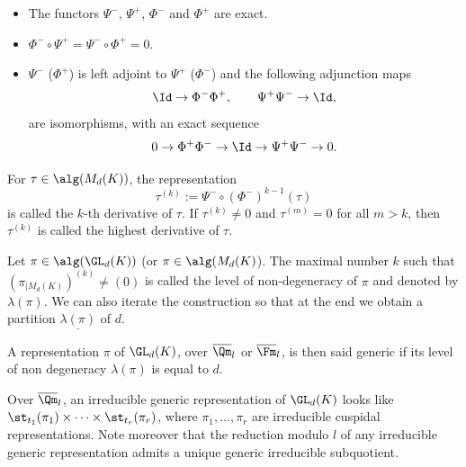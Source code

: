 \skpt
\begin{prop}
\begin{itemize}
\item The functors $\Psi^-$, $\Psi^+$, $\Phi^-$ and $\Phi^+$ are exact.

\item $\Phi^- \circ \Psi^+=\Psi^- \circ \Phi^+=0$.

\item $\Psi^-$ (\resp $\Phi^+$) is left adjoint to $\Psi^+$ (\resp $\Phi^-$) and the
following adjunction maps
\[
\Id \to \Phi^- \Phi^+, \qquad \Psi^+ \Psi^- \to \Id,
\]
are isomorphisms, with an exact sequence
\[
0 \to \Phi^+ \Phi^- \to \Id \to \Psi^+ \Psi^-
\to 0.
\]
\end{itemize}
\end{prop}

\begin{defin}
For $\tau \in \alg(M_d(K))$, the representation
\[
\tau^{(k)}:=\Psi^- \circ (\Phi^-)^{k-1}(\tau)
\]
is called the $k$-th derivative of $\tau$. If $\tau^{(k)}\neq 0$ and $\tau^{(m)}=0$
for all $m > k$, then $\tau^{(k)}$ is called the highest derivative of $\tau$.
\end{defin}

\begin{nota} \label{nota-nondegeneracy}
Let $\pi \in \alg(\GL_d(K))$ (or $\pi \in \alg(M_d(K)$). The maximal number $k$ such that
$(\pi_{|M_d(K)})^{(k)} \neq (0)$ is called the level of non-degeneracy of $\pi$ and
denoted by $\lambda(\pi)$. We can also iterate the construction so that at the end we obtain
a partition $\underline{\lambda(\pi)}$ of $d$.
\end{nota}

\begin{defin}
A representation $\pi$ of $\GL_d(K)$, over $\overline \Qm_l$ or $\overline \Fm_l$, is then said generic
if its level of non degeneracy $\lambda(\pi)$ is equal to $d$.
\end{defin}

\begin{remark}
Over $\overline \Qm_l$, an irreducible generic representation of
$\GL_d(K)$ looks like $\st_{t_1}(\pi_1) \times \cdots \times \st_{t_r}(\pi_r)$,
where $\pi_1,\dots, \pi_r$ are irreducible cuspidal representations. Note
moreover that the reduction modulo $l$ of any irreducible generic representation
admits a unique generic irreducible subquotient.
\end{remark}

